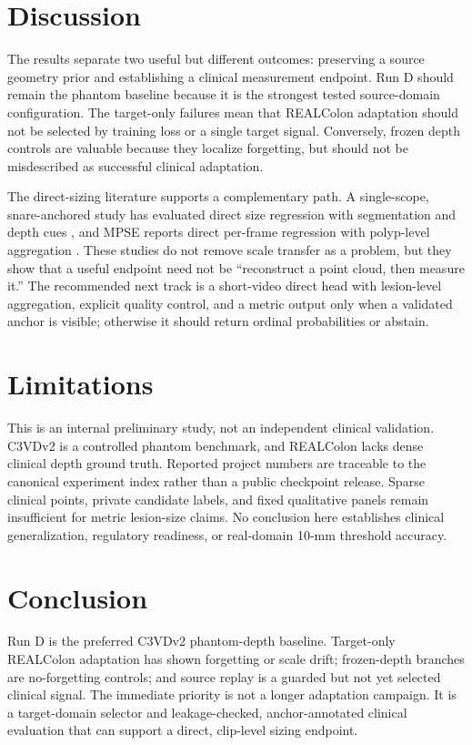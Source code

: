 \documentclass[11pt]{article}
\begin{document}
\section{Discussion}

The results separate two useful but different outcomes: preserving a source
geometry prior and establishing a clinical measurement endpoint. Run D should
remain the phantom baseline because it is the strongest tested source-domain
configuration. The target-only failures mean that REALColon adaptation should
not be selected by training loss or a single target signal. Conversely, frozen
depth controls are valuable because they localize forgetting, but should not be
misdescribed as successful clinical adaptation.

The direct-sizing literature supports a complementary path. A single-scope,
snare-anchored study has evaluated direct size regression with segmentation and
depth cues \cite{yii2025referencefree}, and MPSE reports direct per-frame
regression with polyp-level aggregation \cite{lawrence2026mpse}. These studies
do not remove scale transfer as a problem, but they show that a useful endpoint
need not be ``reconstruct a point cloud, then measure it.'' The recommended
next track is a short-video direct head with lesion-level aggregation, explicit
quality control, and a metric output only when a validated anchor is visible;
otherwise it should return ordinal probabilities or abstain.

\section{Limitations}

This is an internal preliminary study, not an independent clinical validation.
C3VDv2 is a controlled phantom benchmark, and REALColon lacks dense clinical
depth ground truth. Reported project numbers are traceable to the canonical
experiment index rather than a public checkpoint release. Sparse clinical
points, private candidate labels, and fixed qualitative panels remain
insufficient for metric lesion-size claims. No conclusion here establishes
clinical generalization, regulatory readiness, or real-domain 10-mm threshold
accuracy.

\section{Conclusion}

Run D is the preferred C3VDv2 phantom-depth baseline. Target-only REALColon
adaptation has shown forgetting or scale drift; frozen-depth branches are
no-forgetting controls; and source replay is a guarded but not yet selected
clinical signal. The immediate priority is not a longer adaptation campaign.
It is a target-domain selector and leakage-checked, anchor-annotated clinical
evaluation that can support a direct, clip-level sizing endpoint.

\begingroup
\footnotesize


\endgroup
\end{document}
